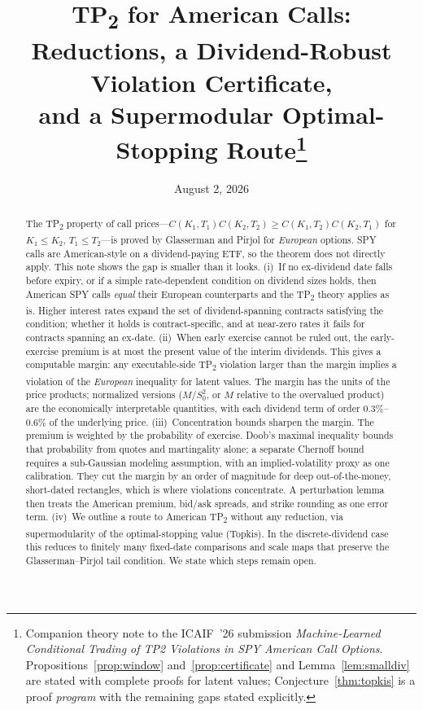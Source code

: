 \documentclass[11pt]{article}
\title{TP\textsubscript{2} for American Calls:\\ Reductions, a Dividend-Robust Violation Certificate,\\ and a Supermodular Optimal-Stopping Route\thanks{Companion theory note to the ICAIF~'26 submission \emph{Machine-Learned Conditional Trading of TP2 Violations in SPY American Call Options}. Propositions~\ref{prop:window} and~\ref{prop:certificate} and Lemma~\ref{lem:smalldiv} are stated with complete proofs for latent values; Conjecture~\ref{thm:topkis} is a proof \emph{program} with the remaining gaps stated explicitly.}}
\author{}
\date{August 2, 2026}
\theoremstyle{remark}
\begin{document}
\maketitle

\begin{abstract}
\noindent The TP\textsubscript{2} property of call prices---$C(K_1,T_1)C(K_2,T_2)\ge C(K_1,T_2)C(K_2,T_1)$ for $K_1\le K_2$, $T_1\le T_2$---is proved by Glasserman and Pirjol for \emph{European} options. SPY calls are American-style on a dividend-paying ETF, so the theorem does not directly apply. This note shows the gap is smaller than it looks. (i)~If no ex-dividend date falls before expiry, or if a simple rate-dependent condition on dividend sizes holds, then American SPY calls \emph{equal} their European counterparts and the TP\textsubscript{2} theory applies as is. Higher interest rates expand the set of dividend-spanning contracts satisfying the condition; whether it holds is contract-specific, and at near-zero rates it fails for contracts spanning an ex-date. (ii)~When early exercise cannot be ruled out, the early-exercise premium is at most the present value of the interim dividends. This gives a computable margin: any executable-side TP\textsubscript{2} violation larger than the margin implies a violation of the \emph{European} inequality for latent values. The margin has the units of the price products; normalized versions ($M/S_0^2$, or $M$ relative to the overvalued product) are the economically interpretable quantities, with each dividend term of order $0.3\%$--$0.6\%$ of the underlying price. (iii)~Concentration bounds sharpen the margin. The premium is weighted by the probability of exercise. Doob's maximal inequality bounds that probability from quotes and martingality alone; a separate Chernoff bound requires a sub-Gaussian modeling assumption, with an implied-volatility proxy as one calibration. They cut the margin by an order of magnitude for deep out-of-the-money, short-dated rectangles, which is where violations concentrate. A perturbation lemma then treats the American premium, bid/ask spreads, and strike rounding as one error term. (iv)~We outline a route to American TP\textsubscript{2} without any reduction, via supermodularity of the optimal-stopping value (Topkis). In the discrete-dividend case this reduces to finitely many fixed-date comparisons and scale maps that preserve the Glasserman--Pirjol tail condition. We state which steps remain open.
\end{abstract}
\end{document}
